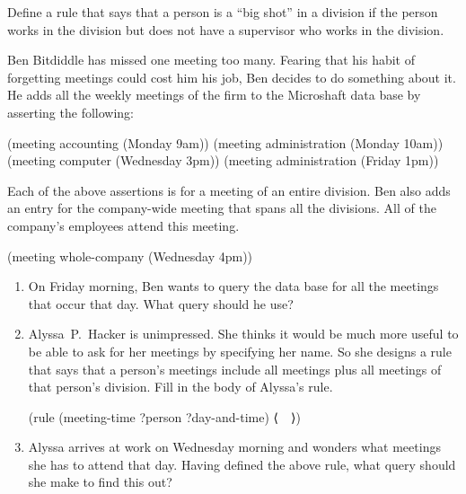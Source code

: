\begin{exercise}
	\label{Exercise 4.58}
	Define a rule that says that a person is a “big shot” in a division if the person works in the division but does not have a supervisor who works in the division.
\end{exercise}



\begin{exercise}
	\label{Exercise 4.59}
	Ben Bitdiddle has missed one meeting too many.
	Fearing that his habit of forgetting meetings could cost him his job, Ben decides to do something about it.
	He adds all the weekly meetings of the firm to the Microshaft data base by asserting the following:
	\begin{scheme}
	  (meeting accounting (Monday 9am))
	  (meeting administration (Monday 10am))
	  (meeting computer (Wednesday 3pm))
	  (meeting administration (Friday 1pm))
	\end{scheme}
	Each of the above assertions is for a meeting of an entire division.
	Ben also adds an entry for the company-wide meeting that spans all the divisions.
	All of the company’s employees attend this meeting.
	\begin{scheme}
	  (meeting whole-company (Wednesday 4pm))
	\end{scheme}
	\begin{enumerate}[label = \alph*., leftmargin = *]

			\item
				On Friday morning, Ben wants to query the data base for all the meetings that occur that day.
				What query should he use?

			\item
				Alyssa P. Hacker is unimpressed.
				She thinks it would be much more useful to be able to ask for her meetings by specifying her name.
				So she designs a rule that says that a person’s meetings include all  meetings plus all meetings of that person’s division.
				Fill in the body of Alyssa’s rule.
				\begin{scheme}
				  (rule (meeting-time ?person ?day-and-time)
				        ⟨~~⟩)
				\end{scheme}

			\item
				Alyssa arrives at work on Wednesday morning and wonders what meetings she has to attend that day.
				Having defined the above rule, what query should she make to find this out?

	\end{enumerate}
\end{exercise}



